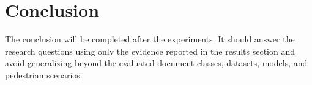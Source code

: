 \section{Conclusion}

The conclusion will be completed after the experiments. It should answer the research questions using only the evidence reported in the results section and avoid generalizing beyond the evaluated document classes, datasets, models, and pedestrian scenarios.
